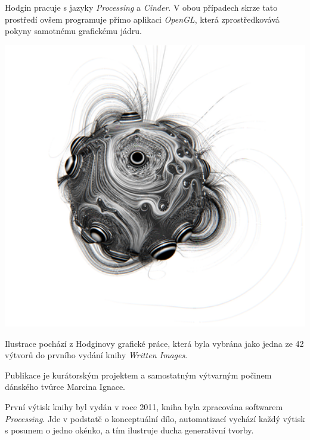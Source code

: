 \documentclass[10pt,twoside=true,open=right,cleardoublepage=empty,chapterprefix=true]{scrbook}
\begin{document}
Hodgin pracuje s jazyky {\em Processing} a {\em Cinder}. V obou případech skrze tato prostředí ovšem programuje přímo aplikaci {\em OpenGL}, která zprostředkovává pokyny samotnému grafickému jádru.

\vfill
\newpage

\begin{centering}
\includegraphics[width = 1\textwidth]{imgs/hogin.png}
\end{centering}

Ilustrace pochází z Hodginovy grafické práce, která byla vybrána jako jedna ze 42 výtvorů do prvního vydání knihy {\em Written Images}.

Publikace je kurátorským projektem a samostatným výtvarným počinem dánského tvůrce Marcina Ignace. 

První výtisk knihy byl vydán v roce 2011, kniha byla zpracována softwarem {\em Processing}. Jde v podstatě o konceptuální dílo, automatizací vychází každý výtisk s posunem o jedno okénko, a tím ilustruje ducha generativní tvorby.

\vfill
\end{document}
